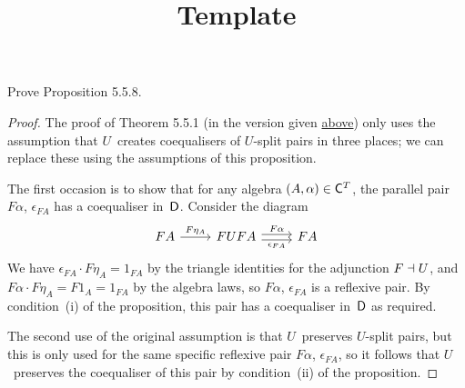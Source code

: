 \documentclass[../../solutions]{subfiles}
\title{Template}
\author{}
\begin{document}
\maketitle

%   

\begin{exercise}
  Prove Proposition 5.5.8.
\end{exercise}

\begin{proof}
  The proof of Theorem 5.5.1 (in the version given
  \hyperref[thm:5.5.1]{above}) only uses the assumption that
  $U$~creates coequalisers of $U$-split pairs in three places; we can
  replace these using the assumptions of this proposition.

  The first occasion is to show that for any algebra
  $(A,\alpha)\in{\mathsf{C}}^T$, the parallel pair $F\alpha$, $\epsilon_{FA}$
  has a coequaliser in~${\mathsf{D}}$.  Consider the diagram
  $$
  \begin{tikzcd}
    FA
    \ar[r, "F\eta_A"]
    &
    FUFA
    \ar[r, shift left=0.5ex, "F\alpha"]
    \ar[r, shift right=0.5ex, "\epsilon_{FA}"']
    & FA
  \end{tikzcd}
  $$
  We have $\epsilon_{FA}\cdot F\eta_A=1_{FA}$ by the triangle
  identities for the adjunction $F\dashv U$, and $F\alpha\cdot F\eta_A=
  F1_A=1_{FA}$ by the algebra laws, so $F\alpha$, $\epsilon_{FA}$ is a
  reflexive pair.  By condition~(i) of the proposition, this pair has
  a coequaliser in~${\mathsf{D}}$ as required.

  The second use of the original assumption is that $U$~preserves
  $U$-split pairs, but this is only used for the same specific
  reflexive pair $F\alpha$, $\epsilon_{FA}$, so it follows that
  $U$~preserves the coequaliser of this pair by condition~(ii) of the
  proposition.


\end{proof}
\end{document}
